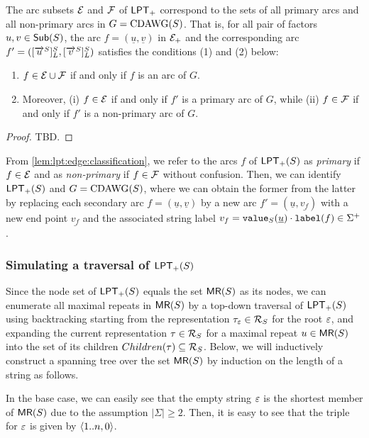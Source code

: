 \documentclass{article}
\begin{document}
\begin{lemma}\label{lem:lpt:edge:classification}
  The arc subsets $\sig E$ and $\sig F$ of $\LPT[+]$ correspond to the sets of all primary arcs and all non-primary arcs in $G = \CDAWG(S)$. That is, for all pair of factors $u, v\in \Sub(S)$, the arc $f = (\underline u, \underline v)$ in $\sig E_+$ and the corresponding arc $f' = ([\rext{u}]^S_L, [\rext{v}]^S_L)$ satisfies the conditions (1) and (2) below: 
\begin{enumerate}[(1)]  
\item $f \in \sig E\cup \sig F$ if and only if $f$ is an arc of $G$. 
\item Moreover, (i) $f \in \sig E$ if and only if $f'$ is a primary arc of $G$, while (ii) $f \in \sig F$ if and only if $f'$ is a non-primary arc of $G$.
\end{enumerate}
\end{lemma}

\begin{proof} TBD. 
\end{proof}

From \cref{lem:lpt:edge:classification}, we refer to the arcs $f$ of $\LPT[+](S)$ as \textit{primary} if $f \in \sig E$ and as \textit{non-primary} if $f \in \sig F$ without confusion. Then, we can identify $\LPT[+](S)$ and $G = \CDAWG(S)$, where we can obtain the former from the latter by replacing each secondary arc $f = (\underline u, \underline v)$ by a new arc $f' = (\underline u, \underline {v_f})$ with a new end point $\underline{v_f}$ and the associated string label $v_f = \Value(\underline u)\cdot \lab(f) \in \Sigma^+$. 

\subsubsection{Simulating a traversal of $\LPT[+](S)$}
Since the node set of $\LPT[+](S)$ equals the set $\MR(S)$ as its nodes, we can enumerate all maximal repeats in $\MR(S)$ by a top-down traversal of $\LPT[+](S)$ using backtracking starting from the representation $\tau_\eps \in \RR$ for the root $\eps$, and expanding the current representation $\tau \in \RR$ for a maximal repeat $u \in \MR(S)$ into the set of its children $Children(\tau) \subseteq \RR$.
Below, we will inductively construct a spanning tree over the set $\MR(S)$ by induction on the length of a string as follows.

In the base case, we can easily see that the empty string $\eps$ is the shortest member of $\MR(S)$ due to the assumption $|\Sigma|\ge 2$. Then, it is easy to see that the triple for $\eps$ is given by $\pair{1..n, 0}$. 
\end{document}
